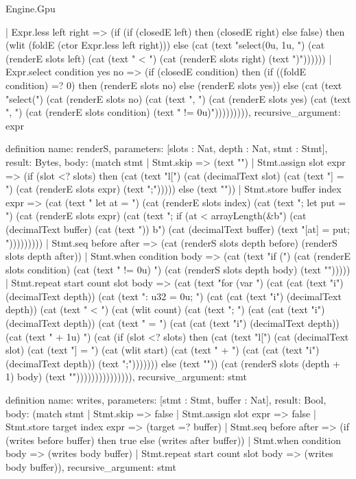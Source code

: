 \begin{lexlean}{Engine.Gpu}
\begin{semanticmodule}
{    | Expr.less left right => (if (if (closedE left) then (closedE right) else false) then (wlit (foldE (ctor Expr.less left right))) else (cat (text "select(0u, 1u, ") (cat (renderE slots left) (cat (text " < ") (cat (renderE slots right) (text ")"))))))
    | Expr.select condition yes no => (if (closedE condition) then (if ((foldE condition) =? 0) then (renderE slots no) else (renderE slots yes)) else (cat (text "select(") (cat (renderE slots no) (cat (text ", ") (cat (renderE slots yes) (cat (text ", ") (cat (renderE slots condition) (text " != 0u)"))))))))),
  recursive_argument: expr
}

definition{
  name: renderS,
  parameters: [slots : Nat, depth : Nat, stmt : Stmt],
  result: Bytes,
  body: (match stmt
    | Stmt.skip => (text "")
    | Stmt.assign slot expr => (if (slot <? slots) then (cat (text "l[") (cat (decimalText slot) (cat (text "] = ") (cat (renderE slots expr) (text ";\n"))))) else (text ""))
    | Stmt.store buffer index expr => (cat (text "{ let at = ") (cat (renderE slots index) (cat (text "; let put = ") (cat (renderE slots expr) (cat (text "; if (at < arrayLength(&b") (cat (decimalText buffer) (cat (text ")) { b") (cat (decimalText buffer) (text "[at] = put; } }\n")))))))))
    | Stmt.seq before after => (cat (renderS slots depth before) (renderS slots depth after))
    | Stmt.when condition body => (cat (text "if (") (cat (renderE slots condition) (cat (text " != 0u) {\n") (cat (renderS slots depth body) (text "}\n")))))
    | Stmt.repeat start count slot body => (cat (text "for (var ") (cat (cat (text "i") (decimalText depth)) (cat (text ": u32 = 0u; ") (cat (cat (text "i") (decimalText depth)) (cat (text " < ") (cat (wlit count) (cat (text "; ") (cat (cat (text "i") (decimalText depth)) (cat (text " = ") (cat (cat (text "i") (decimalText depth)) (cat (text " + 1u) {\n") (cat (if (slot <? slots) then (cat (text "l[") (cat (decimalText slot) (cat (text "] = ") (cat (wlit start) (cat (text " + ") (cat (cat (text "i") (decimalText depth)) (text ";\n"))))))) else (text "")) (cat (renderS slots (depth + 1) body) (text "}\n"))))))))))))))),
  recursive_argument: stmt
}

definition{
  name: writes,
  parameters: [stmt : Stmt, buffer : Nat],
  result: Bool,
  body: (match stmt
    | Stmt.skip => false
    | Stmt.assign slot expr => false
    | Stmt.store target index expr => (target =? buffer)
    | Stmt.seq before after => (if (writes before buffer) then true else (writes after buffer))
    | Stmt.when condition body => (writes body buffer)
    | Stmt.repeat start count slot body => (writes body buffer)),
  recursive_argument: stmt
}


\end{semanticmodule}
\end{lexlean}
